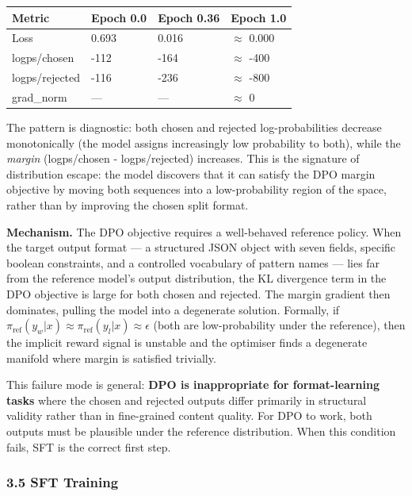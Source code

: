 \documentclass[
  11pt,
]{article}
\newcounter{none} %
\begin{document}
{\def\LTcaptype{none} %
\begin{longtable}[]{@{}llll@{}}
\toprule\noalign{}
Metric & Epoch 0.0 & Epoch 0.36 & Epoch 1.0 \\
\midrule\noalign{}
\endhead
\bottomrule\noalign{}
\endlastfoot
Loss & 0.693 & 0.016 & $\approx$ 0.000 \\
logps/chosen & -112 & -164 & $\approx$ -400 \\
logps/rejected & -116 & -236 & $\approx$ -800 \\
grad\_norm & --- & --- & $\approx$ 0 \\
\end{longtable}
}

The pattern is diagnostic: both chosen and rejected log-probabilities
decrease monotonically (the model assigns increasingly low probability
to both), while the \emph{margin} (logps/chosen - logps/rejected)
increases. This is the signature of distribution escape: the model
discovers that it can satisfy the DPO margin objective by moving both
sequences into a low-probability region of the space, rather than by
improving the chosen split format.

\textbf{Mechanism.} The DPO objective requires a well-behaved reference
policy. When the target output format --- a structured JSON object with
seven fields, specific boolean constraints, and a controlled vocabulary
of pattern names --- lies far from the reference model's output
distribution, the KL divergence term in the DPO objective is large for
both chosen and rejected. The margin gradient then dominates, pulling
the model into a degenerate solution. Formally, if
\(\pi_\text{ref}(y_w|x) \approx \pi_\text{ref}(y_l|x) \approx \epsilon\)
(both are low-probability under the reference), then the implicit reward
signal is unstable and the optimiser finds a degenerate manifold where
margin is satisfied trivially.

This failure mode is general: \textbf{DPO is inappropriate for
format-learning tasks} where the chosen and rejected outputs differ
primarily in structural validity rather than in fine-grained content
quality. For DPO to work, both outputs must be plausible under the
reference distribution. When this condition fails, SFT is the correct
first step.

\subsubsection{3.5 SFT Training}\label{sft-training}
\end{document}
